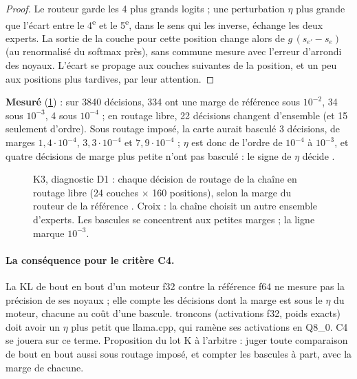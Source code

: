 \begin{proof}
Le routeur garde les 4 plus grands logits ; une perturbation $\eta$ plus grande que l'écart entre le 4\textsuperscript{e} et le 5\textsuperscript{e}, dans le sens qui les inverse, échange les deux experts. La sortie de la couche pour cette position change alors de $g\,(s_{e'} - s_e)$ (au renormalisé du softmax près), sans commune mesure avec l'erreur d'arrondi des noyaux. L'écart se propage aux couches suivantes de la position, et un peu aux positions plus tardives, par leur attention.
\end{proof}

\textbf{Mesuré} (\cref{fig:t2n-routage}) : sur \num{3840} décisions, 334 ont une marge de référence sous $10^{-2}$, 34 sous $10^{-3}$, 4 sous $10^{-4}$ ; en routage libre, 22 décisions changent d'ensemble (et 15 seulement d'ordre). Sous routage imposé, la carte aurait basculé 3 décisions, de marges $1{,}4\cdot10^{-4}$, $3{,}3\cdot10^{-4}$ et $7{,}9\cdot10^{-4}$ ; $\eta$ est donc de l'ordre de $10^{-4}$ à $10^{-3}$, et quatre décisions de marge plus petite n'ont pas basculé : le signe de $\eta$ décide \mes.

\begin{figure}[!htbp]
\centering
\GrapheNoyRoutage
\caption[K3 : les décisions de routage et leurs bascules]{K3, diagnostic D1 : chaque décision de routage de la chaîne en routage libre (24 couches $\times$ 160 positions), selon la marge du routeur de la référence \mes. Croix : la chaîne choisit un autre ensemble d'experts. Les bascules se concentrent aux petites marges ; la ligne marque $10^{-3}$.}
\label{fig:t2n-routage}
\end{figure}

\paragraph{La conséquence pour le critère C4.} La KL de bout en bout d'un moteur f32 contre la référence f64 ne mesure pas la précision de ses noyaux ; elle compte les décisions dont la marge est sous le $\eta$ du moteur, chacune au coût d'une bascule. troncons (activations f32, poids exacts) doit avoir un $\eta$ plus petit que llama.cpp, qui ramène ses activations en Q8\_0. C4 se jouera sur ce terme. Proposition du lot K à l'arbitre : juger toute comparaison de bout en bout aussi sous routage imposé, et compter les bascules à part, avec la marge de chacune.

